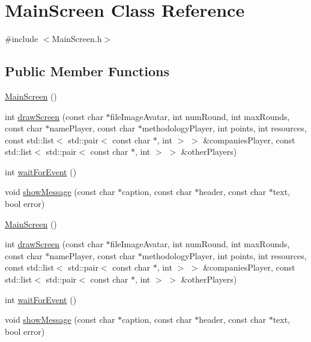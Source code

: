 \hypertarget{classMainScreen}{\section{Main\-Screen Class Reference}
\label{classMainScreen}
}


{\ttfamily \#include $<$Main\-Screen.\-h$>$}

\subsection*{Public Member Functions}
\begin{DoxyCompactItemize}
\item 
\hyperlink{classMainScreen_afe04f97c6cbff7dc13f03344c74e3253}{Main\-Screen} ()
\item 
int \hyperlink{classMainScreen_aa060b16684e89d25104f2fa9cc751961}{draw\-Screen} (const char $\ast$file\-Image\-Avatar, int num\-Round, int max\-Rounds, const char $\ast$name\-Player, const char $\ast$methodology\-Player, int points, int resources, const std\-::list$<$ std\-::pair$<$ const char $\ast$, int $>$ $>$ \&companies\-Player, const std\-::list$<$ std\-::pair$<$ const char $\ast$, int $>$ $>$ \&other\-Players)
\item 
int \hyperlink{classMainScreen_a44cfe11e0495894b7cce6fbba1395a90}{wait\-For\-Event} ()
\item 
void \hyperlink{classMainScreen_a055b854813b4a149f4eb43d0a7a4c574}{show\-Message} (const char $\ast$caption, const char $\ast$header, const char $\ast$text, bool error)
\item 
\hyperlink{classMainScreen_afe04f97c6cbff7dc13f03344c74e3253}{Main\-Screen} ()
\item 
int \hyperlink{classMainScreen_aa060b16684e89d25104f2fa9cc751961}{draw\-Screen} (const char $\ast$file\-Image\-Avatar, int num\-Round, int max\-Rounds, const char $\ast$name\-Player, const char $\ast$methodology\-Player, int points, int resources, const std\-::list$<$ std\-::pair$<$ const char $\ast$, int $>$ $>$ \&companies\-Player, const std\-::list$<$ std\-::pair$<$ const char $\ast$, int $>$ $>$ \&other\-Players)
\item 
int \hyperlink{classMainScreen_a44cfe11e0495894b7cce6fbba1395a90}{wait\-For\-Event} ()
\item 
void \hyperlink{classMainScreen_a055b854813b4a149f4eb43d0a7a4c574}{show\-Message} (const char $\ast$caption, const char $\ast$header, const char $\ast$text, bool error)
\end{DoxyCompactItemize}


